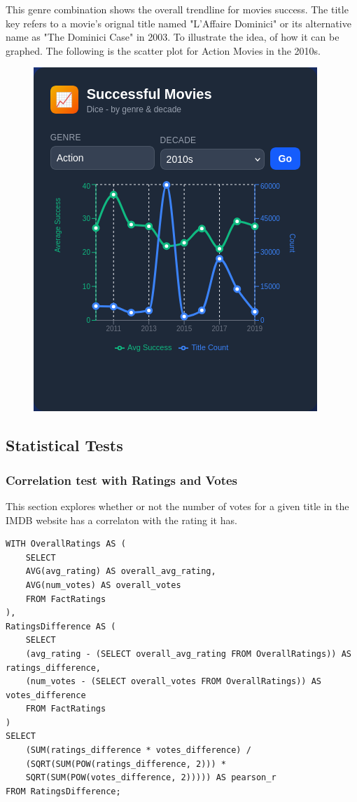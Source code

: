 This genre combination shows the overall trendline for movies success. The title key refers to a movie's orignal title named "L'Affaire Dominici" or its alternative name as "The Dominici Case" in 2003. To illustrate the idea, of how it can be graphed. The following is the scatter plot for Action Movies in the 2010s.
\begin{figure}[h!]
	\centering
	\includegraphics[width=0.7\linewidth]{images/image3.png}
	\caption{}
\end{figure}


\subsection{Statistical Tests}
\subsubsection{Correlation test with Ratings and Votes}

This section explores whether or not the number of votes for a given title in the IMDB website has a correlaton with the rating it has.

\begin{lstlisting}[style=SQLStyle]
WITH OverallRatings AS (
	SELECT 
	AVG(avg_rating) AS overall_avg_rating,
	AVG(num_votes) AS overall_votes
	FROM FactRatings
),
RatingsDifference AS (
	SELECT 
	(avg_rating - (SELECT overall_avg_rating FROM OverallRatings)) AS ratings_difference,
	(num_votes - (SELECT overall_votes FROM OverallRatings)) AS votes_difference
	FROM FactRatings
)
SELECT 
	(SUM(ratings_difference * votes_difference) /
	(SQRT(SUM(POW(ratings_difference, 2))) *
	SQRT(SUM(POW(votes_difference, 2))))) AS pearson_r
FROM RatingsDifference;
\end{lstlisting}

